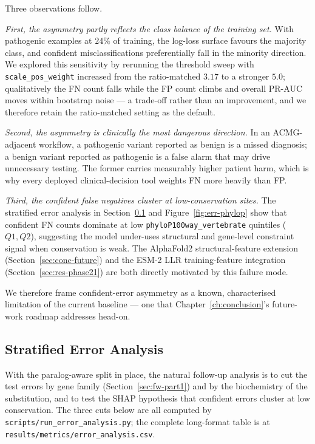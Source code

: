 \documentclass[11pt,a4paper,oneside]{report}
\begin{document}
Three observations follow.

\emph{First, the asymmetry partly reflects the class balance
of the training set.} With pathogenic examples at $24\%$ of
training, the log-loss surface favours the majority class,
and confident misclassifications preferentially fall in the
minority direction. We explored this sensitivity by rerunning
the threshold sweep with \texttt{scale\_pos\_weight}
increased from the ratio-matched $3.17$ to a stronger
$5.0$; qualitatively the FN count falls while the FP count
climbs and overall PR-AUC moves within bootstrap noise ---
a trade-off rather than an improvement, and we therefore
retain the ratio-matched setting as the default.

\emph{Second, the asymmetry is clinically the most
dangerous direction.} In an ACMG-adjacent workflow, a
pathogenic variant reported as benign is a missed diagnosis;
a benign variant reported as pathogenic is a false alarm
that may drive unnecessary testing. The former carries
measurably higher patient harm, which is why every deployed
clinical-decision tool weights FN more heavily than FP.

\emph{Third, the confident false negatives cluster at
low-conservation sites.} The stratified error analysis in
Section~\ref{sec:res-errors} and Figure~\ref{fig:err-phylop}
show that confident FN counts dominate at low
\texttt{phyloP100way\_vertebrate} quintiles ($Q1, Q2$),
suggesting the model under-uses structural and gene-level
constraint signal when conservation is weak. The
AlphaFold2 structural-feature extension
(Section~\ref{sec:conc-future}) and the ESM-2 LLR
training-feature integration (Section~\ref{sec:res-phase21})
are both directly motivated by this failure mode.

We therefore frame confident-error asymmetry as a known,
characterised limitation of the current baseline --- one
that Chapter~\ref{ch:conclusion}'s future-work roadmap
addresses head-on.

\subsection{Stratified Error Analysis}
\label{sec:res-errors}

With the paralog-aware split in place, the natural
follow-up analysis is to cut the test errors by gene
family (Section~\ref{sec:fw-part1}) and by the
biochemistry of the substitution, and to test the SHAP
hypothesis that confident errors cluster at low
conservation. The three cuts below are all computed by
\texttt{scripts/run\_error\_analysis.py}; the complete
long-format table is at
\texttt{results/metrics/error\_analysis.csv}.
\end{document}
